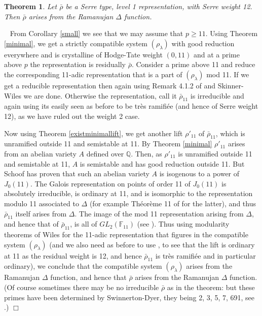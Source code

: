 \documentclass[12pt]{article}
\newcommand{\Q}{\mathbb{Q}}
\newcommand{\rhobar}{\overline{\rho}}
\newtheorem{theorem}{Theorem}[section]
\newenvironment{proof}{\smallskip\noindent{\bf Proof.}\
}{$\Box$\smallskip\goodbreak}
\def\rhobar{ {\bar {\rho} } }
\def\rhob{ {\bar {\rho} } }
\newcommand{\F}{{\mathbb F}}
\begin{document}
\begin{theorem}\label{weight12}
Let  $\rhob$ be a Serre type, level 1 representation,
with Serre weight 12. Then $\rhob$ arises from the Ramanujan $\Delta$
function.
\end{theorem}


\begin{proof}
From Corollary \ref{small} we see that we may assume
that $p \geq 11$. Using Theorem \ref{minimal},
we get a strictly compatible system $(\rho_\lambda)$
with good reduction everywhere and is
crystalline of Hodge-Tate weight $(0,11)$ and at a prime above $p$ the
representation is residually $\rhob$. Consider a prime above
11 and reduce the corresponding 11-adic representation that is a part of
$(\rho_\lambda)$ mod 11. If we get a reducible representation then again
using
Remark 4.1.2 of \cite{BLZ} and Skinner-Wiles \cite{SW2} we are done.
Otherwise
the
representation,
call it $\rhob_{11}$ is irreducible and again using \cite{BLZ}
its easily seen  as before to
be tr\`es ramifi\'ee (and hence of Serre weight 12), as we have ruled
out the weight 2 case.

Now using Theorem
\ref{existminimallift}, we
get another lift $\rho '_{11}$ of $\rhob_{11}$, which is
unramified outside 11 and semistable at 11.
By Theorem \ref{minimal} $\rho '_{11}$ arises
from an abelian variety $A$ defined
over $\Q$. Then, as
$\rho '_{11}$ is unramified outside 11 and semistable at 11,
$A$ is semistable and has good reduction outside 11.
But Schoof \cite{Schoof1} has proven that such an abelian
variety $A$ is isogenous to a power of $J_0(11 )$.
The Galois representation on points of order 11 of
$J_0 (11 )$ is absolutely irreducible, is ordinary at 11, and is isomorphic
to the representation modulo 11 associated to $\Delta$
(for example Th\'eor\`eme 11 of \cite{Serre2} for the latter), and
thus $\rhob_{11}$ itself arises from $\Delta$.
The image of the mod 11 representation arising from $\Delta$, and
hence that of $\rhob_{11}$, is all of $GL_2(\F_{11})$
(see \cite{Serre4}).
Thus using modularity theorems of Wiles \cite{Wiles} for the 11-adic
representation that figures in the compatible system $(\rho_\lambda)$ (and
we
also need as before to use \cite{BLZ}, to see that the lift is ordinary at
11
as the residual weight is 12,
and hence $\rhob_{11}$ is tr\`es ramifi\'ee and in particular ordinary),
we conclude that the compatible system $(\rho_\lambda)$ arises from the
Ramanujan $\Delta$ function, and hence that $\rhob$ arises from the
Ramanujan
$\Delta$ function.
(Of course sometimes there may be no irreducible
$\rhobar$ as in the theorem: but these primes
have been determined by Swinnerton-Dyer, they being 2, 3, 5, 7, 691,
see \cite{Serre4}.)
\end{proof}
\end{document}
